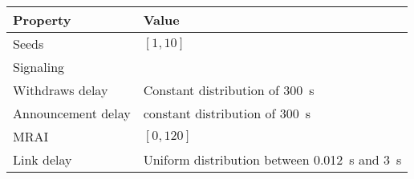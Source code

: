 \begin{center}
	\begin{tabular}{ || m{4cm}| m{8cm} || } 
	\hline
	Property & Value \\ 
	\hline \hline
	Seeds & $[1, 10]$ \\ 
	\hline
	Signaling & \q{AWAWAWA} \\
	\hline
		Withdraws delay & Constant distribution of \SI{300}{\second} \\ 
	\hline
	Announcement delay & constant distribution of \SI{300}{\second} \\ 
	\hline
		MRAI & $[0, 120]$ \\
	\hline
	Link delay & Uniform distribution between \SI{0.012}{\second} and \SI{3}{\second} \\
	\hline
	\end{tabular}
\end{center}
